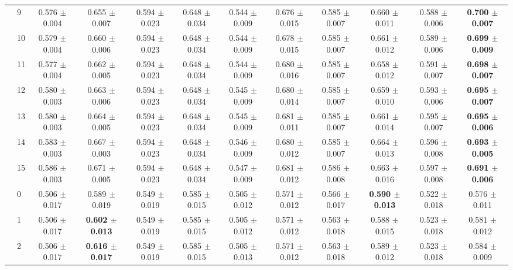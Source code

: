 \begin{table*}[t]
{\begin{tabular}{%
  ll
  @{\quad}
  c@{\hskip 4pt}c
  @{\quad\quad}
  c@{\hskip 4pt}c
  @{\quad\quad}
  c@{\hskip 4pt}c
  @{\quad\quad}
  c@{\hskip 4pt}c
  @{\quad\quad}
  c@{\hskip 4pt}c
}
        & 9 & 0.576 $\pm$ 0.004 & 0.655 $\pm$ 0.007 & 0.594 $\pm$ 0.023 & 0.648 $\pm$ 0.034 & 0.544 $\pm$ 0.009 & 0.676 $\pm$ 0.015 & 0.585 $\pm$ 0.007 & 0.660 $\pm$ 0.011 & 0.588 $\pm$ 0.006 & \textbf{0.700 $\pm$ 0.007} \\
        & 10 & 0.579 $\pm$ 0.004 & 0.660 $\pm$ 0.006 & 0.594 $\pm$ 0.023 & 0.648 $\pm$ 0.034 & 0.544 $\pm$ 0.009 & 0.678 $\pm$ 0.015 & 0.585 $\pm$ 0.007 & 0.661 $\pm$ 0.012 & 0.589 $\pm$ 0.006 & \textbf{0.699 $\pm$ 0.009} \\
        & 11 & 0.577 $\pm$ 0.004 & 0.662 $\pm$ 0.005 & 0.594 $\pm$ 0.023 & 0.648 $\pm$ 0.034 & 0.544 $\pm$ 0.009 & 0.680 $\pm$ 0.016 & 0.585 $\pm$ 0.007 & 0.658 $\pm$ 0.012 & 0.591 $\pm$ 0.007 & \textbf{0.698 $\pm$ 0.007} \\
        & 12 & 0.580 $\pm$ 0.003 & 0.663 $\pm$ 0.006 & 0.594 $\pm$ 0.023 & 0.648 $\pm$ 0.034 & 0.545 $\pm$ 0.009 & 0.680 $\pm$ 0.014 & 0.585 $\pm$ 0.007 & 0.659 $\pm$ 0.010 & 0.593 $\pm$ 0.006 & \textbf{0.695 $\pm$ 0.007} \\
        & 13 & 0.580 $\pm$ 0.003 & 0.664 $\pm$ 0.005 & 0.594 $\pm$ 0.023 & 0.648 $\pm$ 0.034 & 0.545 $\pm$ 0.009 & 0.681 $\pm$ 0.011 & 0.585 $\pm$ 0.007 & 0.661 $\pm$ 0.014 & 0.595 $\pm$ 0.007 & \textbf{0.695 $\pm$ 0.006} \\
        & 14 & 0.583 $\pm$ 0.003 & 0.667 $\pm$ 0.003 & 0.594 $\pm$ 0.023 & 0.648 $\pm$ 0.034 & 0.546 $\pm$ 0.009 & 0.680 $\pm$ 0.012 & 0.585 $\pm$ 0.007 & 0.664 $\pm$ 0.013 & 0.596 $\pm$ 0.008 & \textbf{0.693 $\pm$ 0.005} \\
        & 15 & 0.586 $\pm$ 0.003 & 0.671 $\pm$ 0.005 & 0.594 $\pm$ 0.023 & 0.648 $\pm$ 0.034 & 0.547 $\pm$ 0.009 & 0.681 $\pm$ 0.012 & 0.586 $\pm$ 0.008 & 0.663 $\pm$ 0.016 & 0.597 $\pm$ 0.008 & \textbf{0.691 $\pm$ 0.006} \\
\midrule
\assist{} & 0 & 0.506 $\pm$ 0.017 & 0.589 $\pm$ 0.019 & 0.549 $\pm$ 0.019 & 0.585 $\pm$ 0.015 & 0.505 $\pm$ 0.012 & 0.571 $\pm$ 0.012 & 0.566 $\pm$ 0.017 & \textbf{0.590 $\pm$ 0.013} & 0.522 $\pm$ 0.018 & 0.576 $\pm$ 0.011 \\
        & 1 & 0.506 $\pm$ 0.017 & \textbf{0.602 $\pm$ 0.013} & 0.549 $\pm$ 0.019 & 0.585 $\pm$ 0.015 & 0.505 $\pm$ 0.012 & 0.571 $\pm$ 0.012 & 0.563 $\pm$ 0.018 & 0.588 $\pm$ 0.015 & 0.523 $\pm$ 0.018 & 0.581 $\pm$ 0.012 \\
        & 2 & 0.506 $\pm$ 0.017 & \textbf{0.616 $\pm$ 0.017} & 0.549 $\pm$ 0.019 & 0.585 $\pm$ 0.015 & 0.505 $\pm$ 0.013 & 0.571 $\pm$ 0.012 & 0.563 $\pm$ 0.018 & 0.589 $\pm$ 0.012 & 0.523 $\pm$ 0.018 & 0.584 $\pm$ 0.009 \\

\end{tabular}}
\end{table*}
